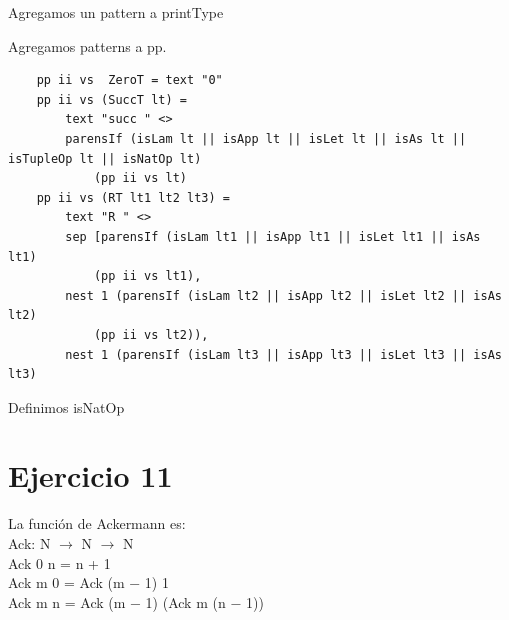 \documentclass{article}
\begin{document}
	Agregamos un pattern a printType
	
	Agregamos patterns a pp.
	\begin{lstlisting}
	pp ii vs  ZeroT = text "0"
	pp ii vs (SuccT lt) = 
		text "succ " <>
		parensIf (isLam lt || isApp lt || isLet lt || isAs lt || isTupleOp lt || isNatOp lt) 
			(pp ii vs lt)
	pp ii vs (RT lt1 lt2 lt3) = 
		text "R " <>
		sep [parensIf (isLam lt1 || isApp lt1 || isLet lt1 || isAs lt1) 
			(pp ii vs lt1), 
		nest 1 (parensIf (isLam lt2 || isApp lt2 || isLet lt2 || isAs lt2) 
			(pp ii vs lt2)), 
		nest 1 (parensIf (isLam lt3 || isApp lt3 || isLet lt3 || isAs lt3)
	\end{lstlisting} 
	\newpage
	Definimos isNatOp
	
	\newpage
	\section*{Ejercicio 11}

	La función de Ackermann es: \\
	Ack: N $\rightarrow$ N $\rightarrow$ N \\
	Ack 0 n = n + 1 \\
	Ack m 0 = Ack (m − 1) 1 \\
	Ack m n = Ack (m − 1) (Ack m (n − 1)) \\
	
\end{document}
